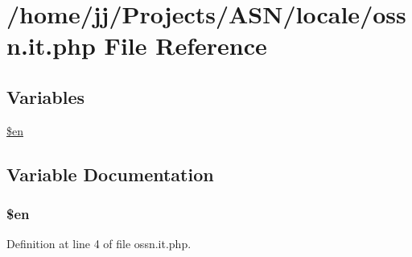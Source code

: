 \hypertarget{locale_2ossn_8it_8php}{}\section{/home/jj/\+Projects/\+A\+S\+N/locale/ossn.it.\+php File Reference}
\label{locale_2ossn_8it_8php}
\subsection*{Variables}
\begin{DoxyCompactItemize}
\item 
\hyperlink{locale_2ossn_8it_8php_a48abc714dfb71c8fffa83cf49f452115}{\$en}
\end{DoxyCompactItemize}


\subsection{Variable Documentation}
\subsubsection[{\texorpdfstring{\$en}{$en}}]{\setlength{\rightskip}{0pt plus 5cm}\$en}\hypertarget{locale_2ossn_8it_8php_a48abc714dfb71c8fffa83cf49f452115}{}\label{locale_2ossn_8it_8php_a48abc714dfb71c8fffa83cf49f452115}


Definition at line 4 of file ossn.\+it.\+php.

